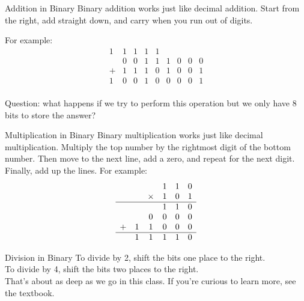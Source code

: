 \begin{frame}{Addition in Binary}
    Binary addition works just like decimal addition.
    Start from the right, add straight down, and carry when you run out of digits.

    For example:
    \[
        \begin{array}{ccccccccc}
            1 & 1 & 1 & 1 & 1 &   &   &   &   \\
              & 0 & 0 & 1 & 1 & 1 & 0 & 0 & 0 \\
            + & 1 & 1 & 1 & 0 & 1 & 0 & 0 & 1 \\
            \hline
            1 & 0 & 0 & 1 & 0 & 0 & 0 & 0 & 1 \\
        \end{array}
    \]

    Question: what happens if we try to perform this operation but we only have 8
    bits to store the answer?
\end{frame}

\begin{frame}{Multiplication in Binary}
    Binary multiplication works just like decimal multiplication.
    Multiply the top number by the rightmost digit of the bottom number.
    Then move to the next line, add a zero, and repeat for the next digit.
    Finally, add up the lines. For example:
    \[
        \begin{array}{cccccc}
              &   &        & 1 & 1 & 0 \\
              &   & \times & 1 & 0 & 1 \\
            \hline
              &   &        & 1 & 1 & 0 \\
              &   & 0      & 0 & 0 & 0 \\
            + & 1 & 1      & 0 & 0 & 0 \\
            \hline
              & 1 & 1      & 1 & 1 & 0 \\
        \end{array}
    \]
\end{frame}

\begin{frame}{Division in Binary}
    To divide by 2, shift the bits one place to the right. \\

    To divide by 4, shift the bits two places to the right. \\

    That's about as deep as we go in this class. If you're curious to learn more,
    see the textbook.

\end{frame}

